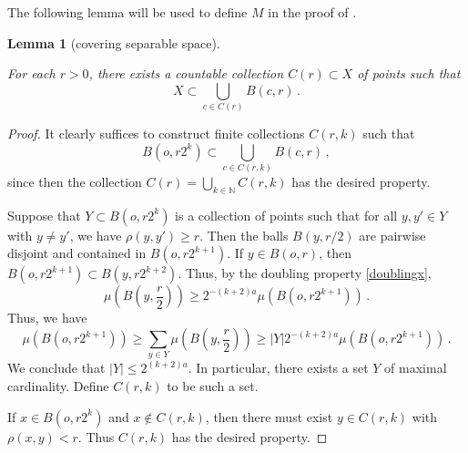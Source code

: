 \documentclass[10pt,a4paper]{article}
\theoremstyle{plain}
\newtheorem{lemma}[theorem]{Lemma}
\theoremstyle{definition}
\numberwithin{equation}{subsection}
\newcommand{\lean}[1]{}
\newcommand{\leanok}{}
\begin{document}
The following lemma will be used to define $M$ in the proof of .
\begin{lemma}[covering separable space]
    \label{covering-separable-space}
    \leanok
    \lean{Metric.dense_iff_iUnion_ball, TopologicalSpace.exists_countable_dense}
    For each $r > 0$, there exists a countable collection $C(r) \subset X$ of points such that
    $$
        X \subset \bigcup_{c \in C(r)} B(c, r)\,.
    $$
\end{lemma}

\begin{proof}
    \leanok
    It clearly suffices to construct finite collections $C(r,k)$ such that
    $$
        B(o, r2^k) \subset \bigcup_{c \in C(r,k)} B(c,r)\,,
    $$
    since then the collection $C(r) = \bigcup_{k \in \mathbb{N}} C(r,k)$ has the desired property.

    Suppose that $Y \subset B(o, r2^k)$ is a collection of points such that for all $y, y' \in Y$ with $y \ne y'$, we have $\rho(y,y') \ge r$. Then the balls $B(y, r/2)$ are pairwise disjoint and contained in $B(o, r2^{k+1})$. If $y \in B(o, r)$, then $B(o, r2^{k+1}) \subset B(y, r2^{k+2})$. Thus, by the doubling property \eqref{doublingx},
    $$
        \mu(B(y, \frac{r}{2})) \ge 2^{-(k+2)a} \mu(B(o, r2^{k+1}))\,.
    $$
    Thus, we have
    $$
        \mu(B(o, r2^{k+1})) \ge \sum_{y \in Y} \mu(B(y, \frac{r}{2})) \ge |Y| 2^{-(k+2)a} \mu(B(o, r2^{k+1}))\,.
    $$
    We conclude that $|Y| \le 2^{(k+2)a}$. In particular, there exists a set $Y$ of maximal cardinality. Define $C(r,k)$ to be such a set.

    If $x \in B(o, r2^k)$ and $x \notin C(r,k)$, then there must exist $y \in C(r,k)$ with $\rho(x,y) < r$. Thus $C(r,k)$ has the desired property.
\end{proof}
\end{document}
